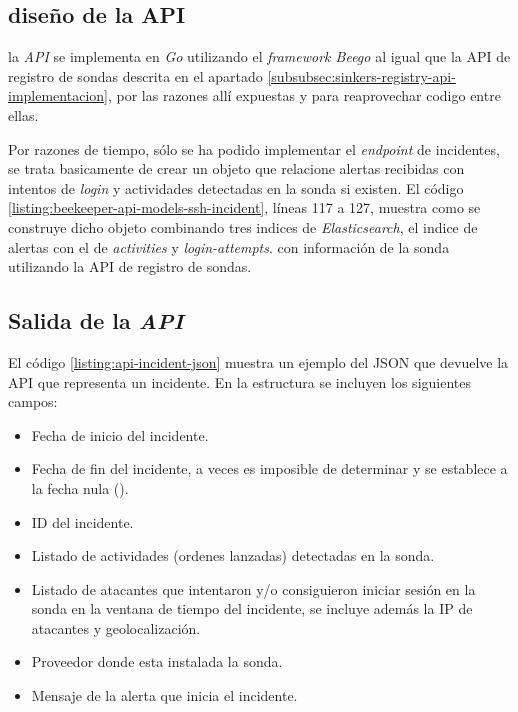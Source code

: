 \subsection{diseño de la API}

la \emph{API} se implementa en \emph{Go} utilizando el \emph{framework Beego} al igual que la API de registro de sondas descrita en el apartado \ref{subsubsec:sinkers-registry-api-implementacion}, 
por las razones allí expuestas y para reaprovechar codigo entre ellas.

Por razones de tiempo, sólo se ha podido implementar el \emph{endpoint} de incidentes, se trata basicamente de crear un objeto
que relacione alertas recibidas con intentos de \emph{login} y actividades detectadas en la sonda si existen. El código \ref{listing:beekeeper-api-models-ssh-incident}, 
líneas 117 a 127, muestra como se construye dicho objeto combinando tres indices de \emph{Elasticsearch}, el indice de alertas con el de \emph{activities} y \emph{login-attempts}.
con información de la sonda utilizando la API de registro de sondas.

\subsection{Salida de la \emph{API}}

El código \ref{listing:api-incident-json} muestra un ejemplo del JSON que devuelve la API que representa un incidente. En la estructura se 
incluyen los siguientes campos:

\begin{itemize}
    \item[\code{started\_at}] Fecha de inicio del incidente.
    \item[\code{finished\_at}] Fecha de fin del incidente, a veces es imposible de determinar y se establece a la fecha nula ().
    \item[\code{ID}] ID del incidente.
    \item[\code{Activities}] Listado de actividades (ordenes lanzadas) detectadas en la sonda.
    \item[\code{Offenders}] Listado de atacantes que intentaron y/o consiguieron iniciar sesión en la sonda en la ventana de tiempo del incidente, se incluye además la IP de atacantes y geolocalización.
    \item[\code{Provider}] Proveedor donde esta instalada la sonda.
    \item[\code{Triggered}] Mensaje de la alerta que inicia el incidente.
\end{itemize}

